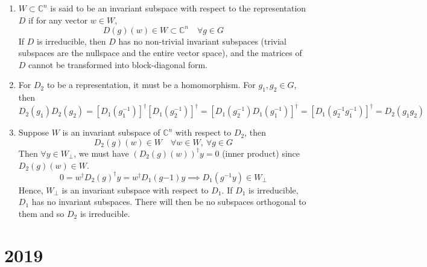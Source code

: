 \documentclass[a4paper]{article}
\begin{document}
\begin{ans}\leavevmode
\begin{enumerate}[label=(\alph*)]
\item $W\subset\mathbb{C}^n$ is said to be an invariant subspace with respect to the representation $D$ if for any vector $w\in W$,
$$D(g)(w)\in W\subset\mathbb{C}^n\quad\forall g\in G$$
If $D$ is irreducible, then $D$ has no non-trivial invariant subspaces (trivial subspaces are the nullspace and the entire vector space), and the matrices of $D$ cannot be transformed into block-diagonal form.
\item For $D_2$ to be a representation, it must be a homomorphism. For $g_1,g_2\in G$, then
$$D_2(g_1)D_2(g_2)=[D_1(g_1^{-1})]^\dag[D_1(g_2^{-1})]^\dag=[D_1(g_2^{-1})D_1(g_1^{-1})]^\dag=[D_1(g_2^{-1}g_1^{-1})]^\dag=D_2(g_1g_2)$$
\item Suppose $W$ is an invariant subspace of $\mathbb{C}^n$ with respect to $D_2$, then
$$D_2(g)(w)\in W\quad\forall w\in W,~\forall g\in G$$
Then $\forall y\in W_\perp$, we must have
$(D_2(g)(w))^\dag y=0$ (inner product) since $D_2(g)(w)\in W$. 
$$0=w^\dag D_2(g)^\dag y=w^\dag D_1(g{-1})y\implies D_1(g^{-1}y)\in W_\perp$$
Hence, $W_\perp$ is an invariant subspace with respect to $D_1$. If $D_1$ is irreducible, $D_1$ has no invariant subspaces. There will then be no subspaces orthogonal to them and so $D_2$ is irreducible.
\end{enumerate}
\end{ans}
\newpage
\section{2019}
\end{document}
